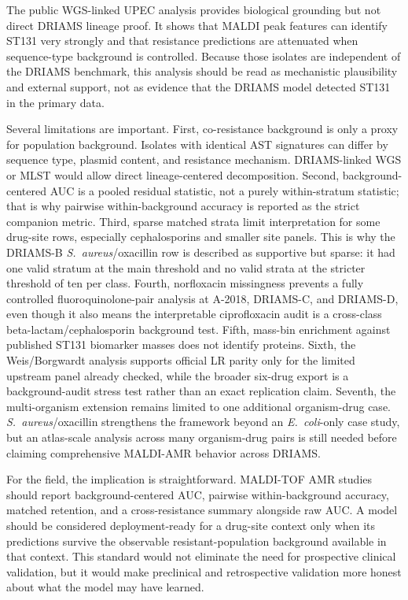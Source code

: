 \documentclass[11pt]{article}
\begin{document}
The public WGS-linked UPEC analysis provides biological grounding but not direct DRIAMS lineage proof. It shows that MALDI peak features can identify ST131 very strongly and that resistance predictions are attenuated when sequence-type background is controlled. Because those isolates are independent of the DRIAMS benchmark, this analysis should be read as mechanistic plausibility and external support, not as evidence that the DRIAMS model detected ST131 in the primary data.

Several limitations are important. First, co-resistance background is only a proxy for population background. Isolates with identical AST signatures can differ by sequence type, plasmid content, and resistance mechanism. DRIAMS-linked WGS or MLST would allow direct lineage-centered decomposition. Second, background-centered AUC is a pooled residual statistic, not a purely within-stratum statistic; that is why pairwise within-background accuracy is reported as the strict companion metric. Third, sparse matched strata limit interpretation for some drug-site rows, especially cephalosporins and smaller site panels. This is why the DRIAMS-B \textit{S.~aureus}/oxacillin row is described as supportive but sparse: it had one valid stratum at the main threshold and no valid strata at the stricter threshold of ten per class. Fourth, norfloxacin missingness prevents a fully controlled fluoroquinolone-pair analysis at A-2018, DRIAMS-C, and DRIAMS-D, even though it also means the interpretable ciprofloxacin audit is a cross-class beta-lactam/cephalosporin background test. Fifth, mass-bin enrichment against published ST131 biomarker masses does not identify proteins. Sixth, the Weis/Borgwardt analysis supports official LR parity only for the limited upstream panel already checked, while the broader six-drug export is a background-audit stress test rather than an exact replication claim. Seventh, the multi-organism extension remains limited to one additional organism-drug case. \textit{S.~aureus}/oxacillin strengthens the framework beyond an \textit{E.~coli}-only case study, but an atlas-scale analysis across many organism-drug pairs is still needed before claiming comprehensive MALDI-AMR behavior across DRIAMS.

For the field, the implication is straightforward. MALDI-TOF AMR studies should report background-centered AUC, pairwise within-background accuracy, matched retention, and a cross-resistance summary alongside raw AUC. A model should be considered deployment-ready for a drug-site context only when its predictions survive the observable resistant-population background available in that context. This standard would not eliminate the need for prospective clinical validation, but it would make preclinical and retrospective validation more honest about what the model may have learned.
\end{document}
